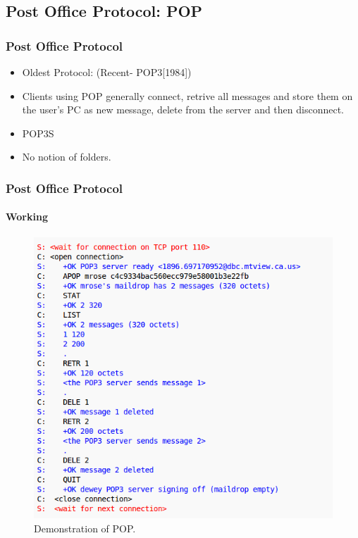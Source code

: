 \documentclass{beamer}
\begin{document}
\subsection{Post Office Protocol: POP} %
\begin{frame}
  \frametitle{Post Office Protocol}
  \begin{itemize}
    \item Oldest Protocol: (Recent- POP3[1984])
    \item Clients using POP generally connect, retrive all messages and store them on the user's PC as new    message, delete from the server and then disconnect. 
    \item POP3S
    \item No notion of folders.
  \end{itemize}
\end{frame}
\begin{frame}
  \frametitle{Post Office Protocol}
  \framesubtitle{Working}
  \begin{figure}[h]
    \includegraphics[scale = 0.35]{pop3.png}
    \caption{Demonstration of POP.}
    \centering
  \end{figure}
\end{frame}
\end{document}
